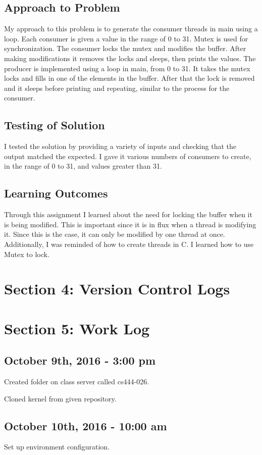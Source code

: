 \documentclass[letterpaper,10pt]{article}
\begin{document}
\subsection{Approach to Problem}
My approach to this problem is to generate the consumer threads in main using a
loop. Each consumer is given a value in the range of 0 to 31. Mutex is used for
synchronization. The consumer locks the mutex and modifies the buffer. After
making modifications it removes the locks and sleeps, then prints the values.
The producer is implemented using a loop in main, from 0 to 31. It takes the
mutex locks and fills in one of the elements in the buffer. After that the lock
is removed and it sleeps before printing and repeating, similar to the process
for the consumer.
\subsection{Testing of Solution}
I tested the solution by providing a variety of inputs and checking that the
output matched the expected. I gave it various numbers of consumers to create,
in the range of 0 to 31, and values greater than 31.
\subsection{Learning Outcomes}
Through this assignment I learned about the need for locking the buffer when it
is being modified. This is important since it is in flux when a thread is
modifying it. Since this is the case, it can only be modified by one thread at
once. Additionally, I was reminded of how to create threads in C. I learned how
to use Mutex to lock.

\section{Section 4: Version Control Logs}

\section{Section 5: Work Log}
\subsection{October 9th, 2016 - 3:00 pm}
Created folder on class server called cs444-026.

Cloned kernel from given repository.
\subsection{October 10th, 2016 - 10:00 am}
Set up environment configuration.
\end{document}
